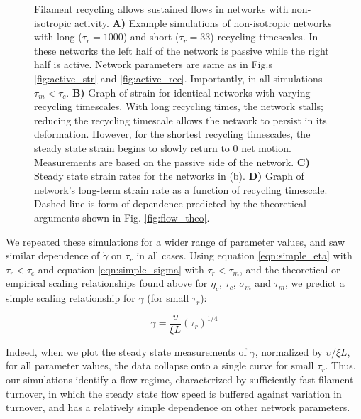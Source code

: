 \documentclass[10pt,letterpaper]{article}
\begin{document}
\begin{figure}[h!]
	\centering
	\caption{\label{fig:flow_ex}  Filament recycling allows sustained flows in networks with non-isotropic activity. \textbf{A)} Example simulations of non-isotropic networks with long ($\tau_r=1000$) and short ($\tau_r=33$) recycling timescales. In these networks the left half of the network is passive while the right half is active.  Network parameters are same as in Fig.s \ref{fig:active_str} and \ref{fig:active_rec}. Importantly, in all simulations $\tau_{m}<\tau_c$. \textbf{B)} Graph of strain for identical networks with varying recycling timescales.  With long recycling times, the network stalls; reducing the recycling timescale allows the network to persist in its deformation.  However, for the shortest recycling timescales, the steady state strain begins to slowly return to 0 net motion.  Measurements are based on the passive side of the network. \textbf{C)} Steady state strain rates for the networks in (b).     \textbf{D)} Graph of network's long-term strain rate as a function of recycling timescale. Dashed line is form of dependence predicted by the  theoretical arguments shown in Fig. \ref{fig:flow_theo}.}
\end{figure}

We repeated these simulations for a wider range of parameter values, and saw similar dependence of $\dot{\gamma}$ on $\tau_r$ in all cases.  Using equation \ref{eqn:simple_eta} with $\tau_r < \tau_c$ and equation \ref{eqn:simple_sigma} with $\tau_r < \tau_m$, and the theoretical or empirical scaling relationships found above for $\eta_c$, $\tau_c$, $\sigma_m$ and $\tau_m$, we predict a simple scaling relationship for $\dot{\gamma}$ (for small $\tau_r$):


\begin{equation}
\label{eqn:flow_scaling_eq}
\dot{\gamma} = \frac{\upsilon}{\xi L}  \left ( \tau_r \right ) ^{1/4}
\end{equation}

Indeed, when we plot the steady state measurements of $\dot{\gamma}$, normalized by $\upsilon/\xi L$,  for all parameter values, the data collapse onto a single curve for small $\tau_r$.  Thus. our simulations identify a flow regime, characterized by sufficiently fast filament turnover, in which the steady state flow speed is buffered against variation in turnover, and has a relatively simple dependence on other network parameters.
\end{document}
